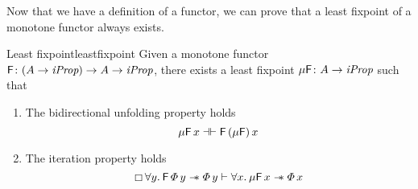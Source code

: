 \documentclass[thesis.tex]{subfiles}
\begin{document}
Now that we have a definition of a functor, we can prove that a least fixpoint of a monotone functor always exists.
\begin{theorem}{Least fixpoint}{leastfixpoint}
    Given a monotone functor $\textsf{\upshape F}\colon (A \to \textit{iProp}) \to  A \to \textit{iProp}$, there exists a least fixpoint $\mu\textsf{\upshape F}\colon  A \to \textit{iProp}$ such that
    \begin{enumerate}
        \item The bidirectional unfolding property holds
              \[ \mu\textsf{\upshape F}\, x \mathrel{\dashv\vdash} \textsf{\upshape F}\, (\mu\textsf{\upshape F})\, x \]
        \item The iteration property holds
              \[ \always \All \varB. \hopred\, \pred\, \varB \wand \pred\, \varB \proves \All \var. \lfp\hopred\, \var \wand \pred\, \var \]
    \end{enumerate}
\end{theorem}
\end{document}
